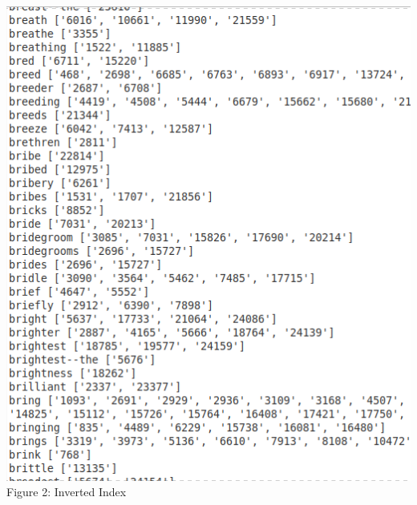 \documentclass[11pt,journal]{article}
\begin{document}
    \includegraphics[width=0.55\linewidth]{inverted_index.png}\\
    \caption{Figure 2: Inverted Index} \\
\end{document}

